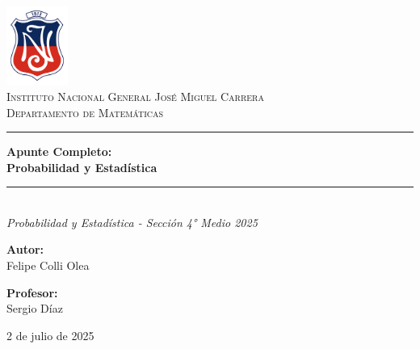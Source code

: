\documentclass[12pt, letterpaper]{article}
\begin{document}
\begin{titlepage}
	\centering
	\includegraphics[width=2cm]{IN}\\[2cm]
	\textsc{\LARGE  Instituto Nacional General José Miguel Carrera}\\[0.5cm]
	\textsc{\Large Departamento de Matemáticas}\\[1.5cm] %

	\rule{\textwidth}{1.5pt}\vspace{0.4cm}
	{\Huge \bfseries Apunte Completo: \\[0.5cm] Probabilidad y Estadística}\\[0.4cm] %
	\rule{\textwidth}{1.5pt}\\[1.5cm]

	{\Large \textit{ Probabilidad y Estadística - Sección 4° Medio 2025}}\\[2cm] %

	\begin{minipage}{0.45\textwidth}
		\begin{flushleft} \large
			\textbf{Autor:}\\
			Felipe Colli Olea
		\end{flushleft}
	\end{minipage}
	\hfill
	\begin{minipage}{0.45\textwidth}
		\begin{flushright} \large
			\textbf{Profesor:}\\
			Sergio Díaz
		\end{flushright}
	\end{minipage}

	\vfill

	{\large 2 de julio de 2025}
\end{titlepage}

\begin{abstract}
	\noindent \textbf{Resumen} \\
	Este apunte ofrece una introducción completa a los conceptos fundamentales de la probabilidad y la estadística. Comienza con la definición de términos esenciales como población, muestra, parámetro y estadígrafo, y la clasificación de variables en cualitativas y cuantitativas. Posteriormente, se profundiza en la estadística descriptiva, abordando las medidas de tendencia central (media, mediana, moda) y de dispersión (rango, varianza, desviación estándar), incluyendo sus propiedades y demostraciones matemáticas. El documento también explora diversas técnicas de muestreo, diferenciando entre métodos probabilísticos (aleatorio simple, estratificado, por conglomerados, sistemático) y no probabilísticos. Finalmente, se introduce la combinatoria mediante los principios aditivo y multiplicativo como base para el cálculo de probabilidades.
\end{abstract}
\end{document}
